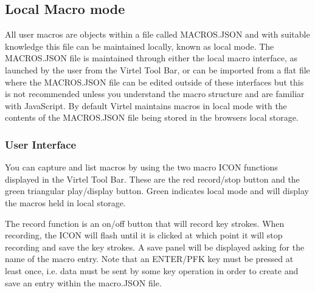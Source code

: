 \documentclass[letterpaper,10pt,english]{sphinxmanual}
\begin{document}
\subsection{Local Macro mode}
\label{\detokenize{Customization:local-macro-mode}}
\sphinxAtStartPar
All user macros are objects within a file called MACROS.JSON and with suitable knowledge this file can be maintained locally, known as local mode. The MACROS.JSON file is maintained through either the local macro interface, as launched by the user from the Virtel Tool Bar, or can be imported from a flat file where the MACROS.JSON file can be edited outside of these interfaces but this is not recommended unless you understand the macro structure and are familiar with JavaScript. By default Virtel maintains macros in local mode with the contents of the MACROS.JSON file being stored in the browsers local storage.


\subsubsection{User Interface}
\label{\detokenize{Customization:user-interface}}
\ignorespaces 
\sphinxAtStartPar
{}

\sphinxAtStartPar
You can capture and list macros by using the two macro ICON functions displayed in the Virtel Tool Bar. These are the red record/stop button and the green triangular play/display button. Green indicates local mode and will display the macros held in local storage.

\sphinxAtStartPar
{}

\sphinxAtStartPar
{}

\sphinxAtStartPar
The record function is an on/off button that will record key strokes. When recording, the ICON will flash until it is clicked at which point it will stop recording and save the key strokes. A save panel will be displayed asking for the name of the macro entry. Note that an ENTER/PFK key must be pressed at least once, i.e. data must be sent by some key operation in order to create and save an entry within the macro.JSON file.

\sphinxAtStartPar
{}
\end{document}
